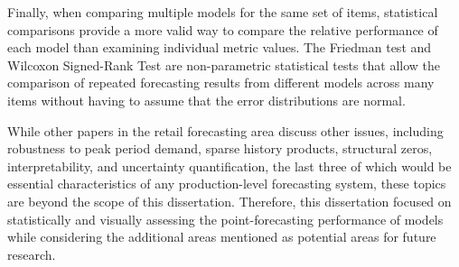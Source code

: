 Finally, when comparing multiple models for the same set of items, statistical comparisons provide a more valid way to compare the relative performance of each model than examining individual metric values. The Friedman test and Wilcoxon Signed-Rank Test are non-parametric statistical tests that allow the comparison of repeated forecasting results from different models across many items without having to assume that the error distributions are normal.

While other papers in the retail forecasting area discuss other issues, including robustness to peak period demand, sparse history products, structural zeros, interpretability, and uncertainty quantification, the last three of which would be essential characteristics of any production-level forecasting system, these topics are beyond the scope of this dissertation. Therefore, this dissertation focused on statistically and visually assessing the point-forecasting performance of models while considering the additional areas mentioned as potential areas for future research.